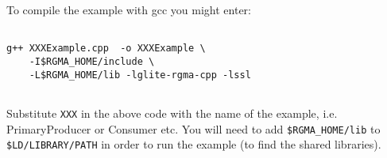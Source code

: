 To compile the example with gcc you might enter:
 
\begin{verbatim}

g++ XXXExample.cpp  -o XXXExample \
    -I$RGMA_HOME/include \
    -L$RGMA_HOME/lib -lglite-rgma-cpp -lssl
   
\end{verbatim}

Substitute \texttt{XXX} in the above code with the name of the example, i.e.
PrimaryProducer or Consumer etc. You will need to add
\verb!$RGMA_HOME!\texttt{/lib} to \verb!$LD!\texttt{/LIBRARY/PATH} in order to
run the example (to find the shared libraries).
